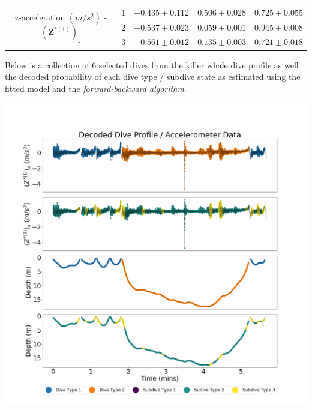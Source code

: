 \documentclass[12pt]{TD-CJS}
\begin{document}
{\begin{tabular}{ccccc}
    \multirow{3}{*}{z-acceleration $(m/s^2)$ - $\left(\mathbf{Z}^{*(1)}\right)_z$} & 1                                    & $-0.435 \pm 0.112$ & $0.506 \pm 0.028$ & $0.725 \pm 0.055$ \\
                                                                                   & 2                                    & $-0.537 \pm 0.023$ & $0.059 \pm 0.001$ & $0.945 \pm 0.008$ \\
                                                                                   & 3                                    & $-0.561 \pm 0.012$ & $0.135 \pm 0.003$ & $0.721 \pm 0.018$ \\ \hline
    \end{tabular}
}

\newpage

Below is a collection of 6 selected dives from the killer whale dive profile as well the decoded probability of each dive type / subdive state as estimated using the fitted model and the \textit{forward-backward algorithm}.

\includegraphics[width=5.5in]{../Plots/CarHHMM1_decoded_dives.png}
\newpage
\end{document}
